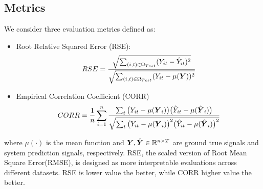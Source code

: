 \subsection{Metrics}
\label{sec:metrics} 
We consider three evaluation metrics defined as:
\begin{itemize}
	\item Root Relative Squared Error (RSE):
        \begin{equation*}
        RSE = \frac{\sqrt{\sum_{(i,t) \in \Omega_{Test}}(Y_{it} - \hat{Y}_{it})^2}}
        			{\sqrt{\sum_{(i,t) \in \Omega_{Test}} (Y_{it} - \mu({\boldsymbol Y}))^2}}
        \end{equation*}
  \item Empirical Correlation Coefficient (CORR)
      \begin{equation*}
      CORR =\frac{1}{n} \sum_{i=1}^n 
        \frac{\sum_t \big(Y_{it} - \mu({{\boldsymbol Y}}_i)\big) \big(\hat{Y}_{it} - \mu(\hat{{\boldsymbol Y}}_i)\big)}
      	     {\sqrt{\sum_t \big(Y_{it} - \mu({{\boldsymbol Y}}_i)\big)^2 \big(\hat{Y}_{it} - \mu(\hat{{\boldsymbol Y}}_i)\big)^2}}
      \label{eq:Correlation}
      \end{equation*}    
\end{itemize}
where $\mu(\cdot)$ is the mean function and ${\boldsymbol Y},\hat{{\boldsymbol Y}} \in \mathbb{R}^{n\times T}$ are ground true signals and system prediction signals, respectively. RSE, the scaled version of Root Mean Square Error(RMSE), is designed as more interpretable evaluations across different datasets. RSE is lower value the better, while CORR higher value the better.

